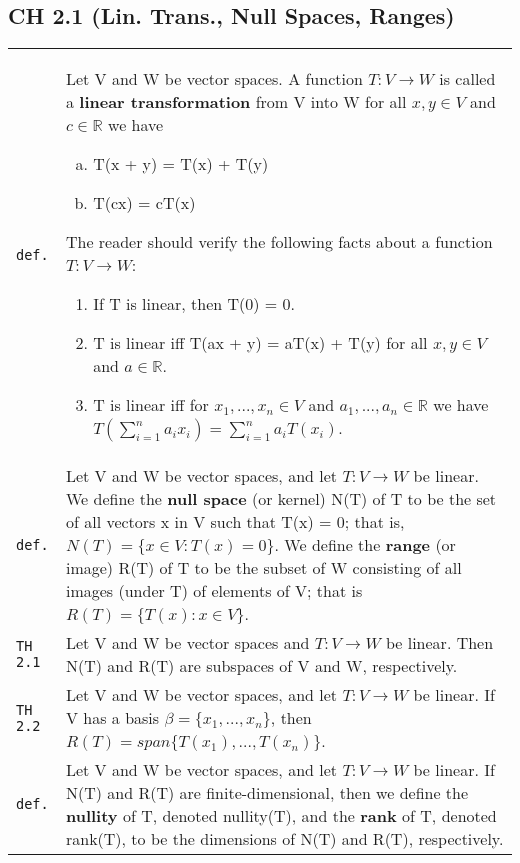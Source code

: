 \documentclass[10pt,landscape]{article}
\begin{document}
\begin{multicols}{3}
\section{CH 2.1 (Lin. Trans., Null Spaces, Ranges)}
\begin{tabular}{@{}p{\the\MyLen}%
                @{}p{\linewidth-\the\MyLen}@{}} %
\verb!def.! & Let V and W be vector spaces. A function $T:V\rightarrow W$ is called a \textbf{linear transformation} from  V into W for all $x,y\in\! V$ and $c\in\!\mathbb{R}$ we have
		   \begin{enumerate}[a)]
		    \item T(x + y) = T(x) + T(y)
		    \item T(cx) = cT(x)
		   \end{enumerate}
		   The reader should verify the following facts about a function $T:V\rightarrow W$:
		   \begin{enumerate}
		   \item If T is linear, then T(0) = 0.
		   \item T is linear iff T(ax + y) = aT(x) + T(y) for all $x, y\in\! V$ and $a\in\!\mathbb{R}$.
		   \item T is linear iff for $x_1 ,..., x_n\!\in\! V$ and $a_1 ,..., a_n \!\in\!\mathbb{R}$ we have $T\left(\sum_{i=1}^n a_i x_i\right) = \sum_{i=1}^n a_i T(x_i)$.
		   \end{enumerate}\\
\verb!def.! & Let V and W be vector spaces, and let $T:V\rightarrow W$ be linear. We define the \textbf{null space} (or kernel) N(T) of T to be the set of all vectors x in V such that T(x) = 0; that is, $N(T) = \{x\!\in\! V: T(x) = 0\}$. 
		   We define the \textbf{range} (or image) R(T) of T to be the subset of W consisting of all images (under T) of elements of V; that is $R(T) = \{T(x):x\!\in\! V\}$.\\
\verb!TH 2.1! & Let V and W be vector spaces and $T:V\rightarrow W$ be linear. Then N(T) and R(T) are subspaces of V and W, respectively.\\
\verb!TH 2.2! & Let V and W be vector spaces, and let $T:V\rightarrow W$ be linear. If V has a basis $\beta = \{x_1 ,..., x_n\}$, then $R(T) = span\{T(x_1 ),..., T(x_n )\}$.\\
\verb!def.! & Let V and W be vector spaces, and let $T:V\rightarrow W$ be linear. If N(T) and R(T) are finite-dimensional, then we define the \textbf{nullity} of T, denoted nullity(T), and the \textbf{rank} of T, denoted rank(T), to be the dimensions of N(T) and R(T), respectively.\\

\end{tabular}
\end{multicols}
\end{document}
